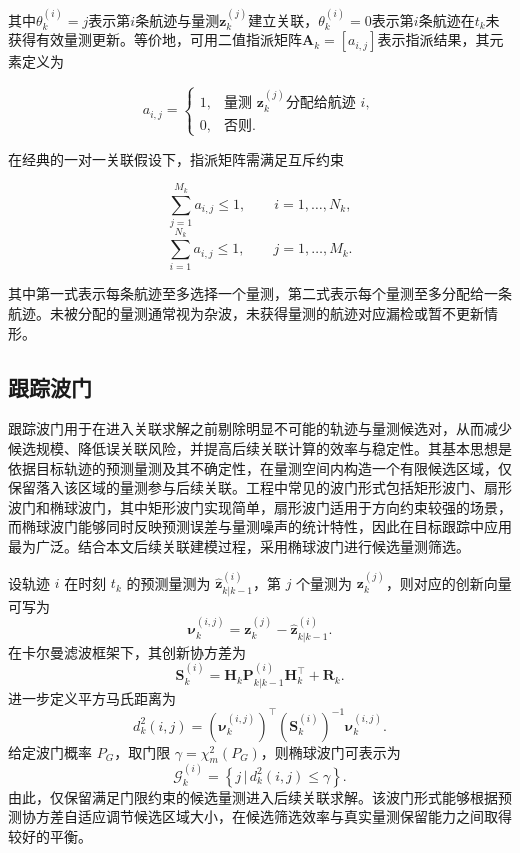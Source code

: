 \documentclass{xdupgthesis}
\begin{document}
其中$\theta_k^{(i)}=j$表示第$i$条航迹与量测$\mathbf{z}^{(j)}_k$建立关联，$\theta_k^{(i)}=0$表示第$i$条航迹在$t_k$未获得有效量测更新。等价地，可用二值指派矩阵$\mathbf{A}_k=[a_{i,j}]$表示指派结果，其元素定义为

\begin{equation}
	a_{i,j}=
	\begin{cases}
		1, & \text{量测 }\mathbf{z}^{(j)}_k \text{分配给航迹 } i,\\
		0, & \text{否则}.
	\end{cases}
\end{equation}

在经典的一对一关联假设下，指派矩阵需满足互斥约束

\begin{equation}
	\sum_{j=1}^{M_k} a_{i,j}\le 1,\qquad i=1,\ldots,N_k,
\end{equation}
\begin{equation}
	\sum_{i=1}^{N_k} a_{i,j}\le 1,\qquad j=1,\ldots,M_k.
\end{equation}

其中第一式表示每条航迹至多选择一个量测，第二式表示每个量测至多分配给一条航迹。未被分配的量测通常视为杂波，未获得量测的航迹对应漏检或暂不更新情形。

\subsection{跟踪波门}

跟踪波门用于在进入关联求解之前剔除明显不可能的轨迹与量测候选对，从而减少候选规模、降低误关联风险，并提高后续关联计算的效率与稳定性。其基本思想是依据目标轨迹的预测量测及其不确定性，在量测空间内构造一个有限候选区域，仅保留落入该区域的量测参与后续关联。工程中常见的波门形式包括矩形波门、扇形波门和椭球波门，其中矩形波门实现简单，扇形波门适用于方向约束较强的场景，而椭球波门能够同时反映预测误差与量测噪声的统计特性，因此在目标跟踪中应用最为广泛。结合本文后续关联建模过程，采用椭球波门进行候选量测筛选。

设轨迹 $i$ 在时刻 $t_k$ 的预测量测为 $\hat{\mathbf{z}}^{(i)}_{k|k-1}$，第 $j$ 个量测为 $\mathbf{z}^{(j)}_k$，则对应的创新向量可写为
\begin{equation}
	\boldsymbol{\nu}^{(i,j)}_k
	=
	\mathbf{z}^{(j)}_k-\hat{\mathbf{z}}^{(i)}_{k|k-1}.
\end{equation}
在卡尔曼滤波框架下，其创新协方差为
\begin{equation}
	\mathbf{S}^{(i)}_k
	=
	\mathbf{H}_k \mathbf{P}^{(i)}_{k|k-1}\mathbf{H}_k^\top+\mathbf{R}_k.
\end{equation}
进一步定义平方马氏距离为
\begin{equation}
	d_k^2(i,j)
	=
	\left(\boldsymbol{\nu}^{(i,j)}_k\right)^\top
	\left(\mathbf{S}^{(i)}_k\right)^{-1}
	\boldsymbol{\nu}^{(i,j)}_k .
\end{equation}
给定波门概率 $P_G$，取门限 $\gamma=\chi_m^2(P_G)$，则椭球波门可表示为
\begin{equation}
	\mathcal{G}^{(i)}_k
	=
	\left\{
	j \,\big|\, d_k^2(i,j)\le \gamma
	\right\}.
\end{equation}
由此，仅保留满足门限约束的候选量测进入后续关联求解。该波门形式能够根据预测协方差自适应调节候选区域大小，在候选筛选效率与真实量测保留能力之间取得较好的平衡。
\end{document}
